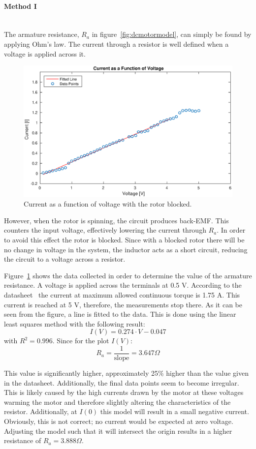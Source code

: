 \paragraph{Method I}~\\
The armature resistance, $R_a$ in figure~\ref{fig:dcmotormodel}, can simply be found by applying Ohm's law.
The current through a resistor is well defined when a voltage is applied across it.

\begin{figure}[!h]
	\centering
	\includegraphics[width=.75\linewidth]{graphics/raplot}
	\caption{Current as a function of voltage with the rotor blocked.}
	\label{fig:raplot}
\end{figure}

However, when the rotor is spinning, the circuit produces back-EMF.
This counters the input voltage, effectively lowering the current through $R_a$.
In order to avoid this effect the rotor is blocked.
Since with a blocked rotor there will be no change in voltage in the system, the inductor acts as a short circuit, reducing the circuit to a voltage across a resistor. 

Figure~\ref{fig:raplot} shows the data collected in order to determine the value of the armature resistance.
A voltage is applied across the terminals at 0.5 V.
According to the datasheet~\cite{pittmann} the current at maximum allowed continuous torque is 1.75 A.
This current is reached at 5 V, therefore, the measurements stop there.
As it can be seen from the figure, a line is fitted to the data.
This is done using the linear least squares method with the following result:
$$I(V)=0.274\cdot V-0.047$$
with $R^2=0.996$.
Since for the plot $I(V)$:
$$R_a = \frac{1}{\text{slope}} = 3.647\Omega$$

This value is significantly higher, approximately 25\% higher than the value given in the datasheet.
Additionally, the final data points seem to become irregular.
This is likely caused by the high currents drawn by the motor at these voltages warming the motor and therefore slightly altering the characteristics of the resistor.
Additionally, at $I(0)$ this model will result in a small negative current.
Obviously, this is not correct; no current would be expected at zero voltage.
Adjusting the model such that it will intersect the origin results in a higher resistance of $R_a=3.888\Omega$.

